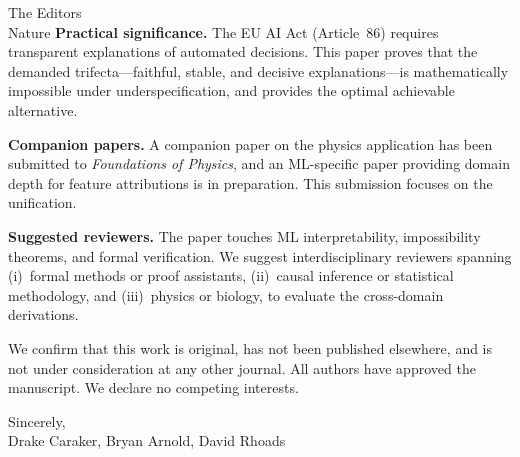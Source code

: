 \documentclass[11pt]{letter}
\begin{document}
\begin{letter}{The Editors\\Nature}
\textbf{Practical significance.}  The EU AI Act (Article~86) requires
transparent explanations of automated decisions.  This paper proves
that the demanded trifecta---faithful, stable, and decisive
explanations---is mathematically impossible under underspecification,
and provides the optimal achievable alternative.

\textbf{Companion papers.}  A companion paper on the physics
application has been submitted to \textit{Foundations of Physics}, and
an ML-specific paper providing domain depth for feature attributions is
in preparation.  This submission focuses on the unification.

\textbf{Suggested reviewers.}  The paper touches ML interpretability,
impossibility theorems, and formal verification.  We suggest
interdisciplinary reviewers spanning (i)~formal methods or proof
assistants, (ii)~causal inference or statistical methodology, and
(iii)~physics or biology, to evaluate the cross-domain derivations.

We confirm that this work is original, has not been published
elsewhere, and is not under consideration at any other journal.  All
authors have approved the manuscript.  We declare no competing
interests.

\closing{Sincerely,\\[0.5em]
Drake Caraker, Bryan Arnold, David Rhoads}

\end{letter}
\end{document}
